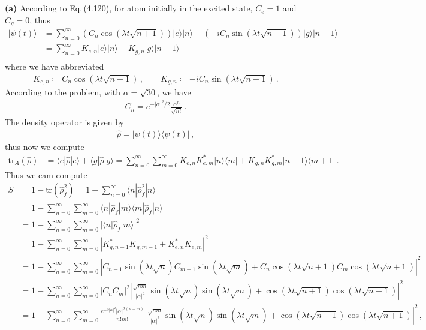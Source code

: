 \documentclass[11pt, oneside]{book}
\theoremstyle{break}
\theoremstyle{break}
\begin{document}
\chapter{}
\textbf{(a)} According to Eq.\,(4.120), for atom initially in the excited state, $C_e = 1$ and $C_g = 0$, thus 
\begin{align*}
|\psi(t) \rangle 
&= \sum_{n=0}^\infty \left(C_n \cos(\lambda t\sqrt{n+1}) \right)|e\rangle |n\rangle+ \left(-i C_{n}\sin(\lambda t\sqrt{n+1}) \right)|g\rangle |n+1\rangle \\
&= \sum_{n=0}^\infty K_{e,n}|e\rangle |n\rangle+ K_{g, n}|g\rangle |n+1\rangle \\
\end{align*}
where we have abbreviated
\begin{align*}
K_{e,n} \coloneqq C_n \cos(\lambda t\sqrt{n+1}) \,,\qquad
K_{g,n} \coloneqq
-i C_{n}\sin(\lambda t\sqrt{n+1})\,.
\end{align*}
According to the problem, with $\alpha = \sqrt{30}$, we have
\begin{align*}
C_n = e^{-|\alpha|^2/2}\frac{\alpha^n}{\sqrt{n!}}\,.
\end{align*}
The density operator is given by
\begin{align*}
\hat{\rho} =  |\psi(t)\rangle \langle \psi(t)|\,,
\end{align*}
thus now we compute
\begin{align*}
\text{tr}_A(\hat{\rho}) 
&= 
\langle e |\hat{\rho}|e\rangle + \langle g| \hat{\rho}|g\rangle 
=
\sum_{n=0}^\infty\sum_{m=0}^\infty K_{e,n}K_{e,m}^* | n\rangle\langle m | + K_{g,n}K_{g,m}^* |n+1\rangle \langle m+1|\,.
\end{align*}
Thus we cam compute
\begin{align*}
S &= 1 - \text{tr}(\hat{\rho}_f^2) 
= 1 - \sum_{n=0}^\infty \langle n |\hat{\rho}_f^2|n\rangle\\
&= 1 - \sum_{n=0}^\infty \sum_{m=0}^\infty\langle n |\hat{\rho}_f | m \rangle \langle m |\hat{\rho}_f | n\rangle\\
&= 1- \sum_{n=0}^\infty\sum_{m=0}^\infty |\langle n |\hat{\rho}_f|m \rangle |^2\\
&=1 - \sum_{n=0}^\infty\sum_{m=0}^\infty \left|K_{g,n-1}^*K_{g,m-1} + K_{e,n}^* K_{e,m} \right|^2\\
&= 1- \sum_{n=0}^\infty\sum_{m=0}^\infty \left|
C_{n-1} \sin(\lambda t\sqrt{n})C_{m-1} \sin(\lambda t\sqrt{m})+C_n \cos(\lambda t \sqrt{n+1})C_m \cos(\lambda t \sqrt{n+1})
\right|^2\\
&= 1- \sum_{n=0}^\infty\sum_{m=0}^\infty |C_{n}C_m|^2\left|
\frac{\sqrt{nm}}{|\alpha|^{2}} \sin(\lambda t\sqrt{n}) \sin(\lambda t\sqrt{m})+\cos(\lambda t \sqrt{n+1}) \cos(\lambda t \sqrt{n+1})
\right|^2\\
&= 1- \sum_{n=0}^\infty\sum_{m=0}^\infty \frac{e^{-2|\alpha|^2}|\alpha|^{2(n+m)}}{n!m!} \left|
\frac{\sqrt{nm}}{|\alpha|^{2}} \sin(\lambda t\sqrt{n}) \sin(\lambda t\sqrt{m})+\cos(\lambda t \sqrt{n+1}) \cos(\lambda t \sqrt{n+1})
\right|^2\,,
\end{align*}
\end{document}
